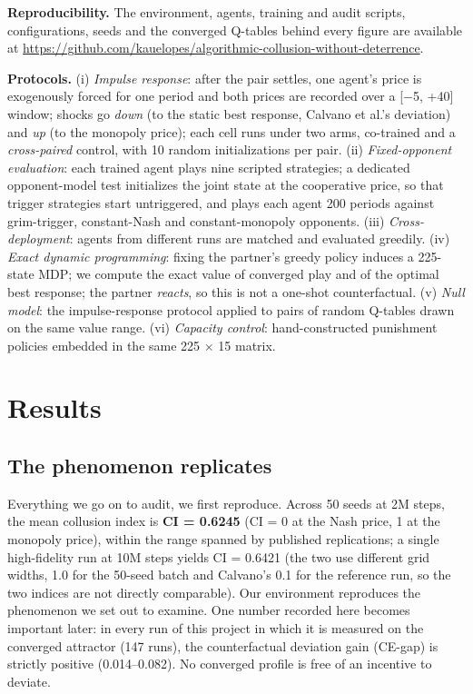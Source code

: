 \documentclass[sigconf]{acmart}
\begin{document}
\textbf{Reproducibility.} The environment, agents, training and audit
scripts, configurations, seeds and the converged Q-tables behind every
figure are available at
\url{https://github.com/kauelopes/algorithmic-collusion-without-deterrence}.

\textbf{Protocols.} (i) \emph{Impulse response}: after the pair settles,
one agent's price is exogenously forced for one period and both prices
are recorded over a {[}\ensuremath{-}5, +40{]} window; shocks go
\emph{down} (to the static best response, Calvano et al.'s deviation)
and \emph{up} (to the monopoly price); each cell runs under two arms,
co-trained and a \emph{cross-paired} control, with 10 random
initializations per pair. (ii) \emph{Fixed-opponent evaluation}: each
trained agent plays nine scripted strategies; a dedicated opponent-model
test initializes the joint state at the cooperative price, so that
trigger strategies start untriggered, and plays each agent 200 periods
against grim-trigger, constant-Nash and constant-monopoly opponents.
(iii) \emph{Cross-deployment}: agents from different runs are matched
and evaluated greedily. (iv) \emph{Exact dynamic programming}: fixing
the partner's greedy policy induces a 225-state MDP; we compute the
exact value of converged play and of the optimal best response; the
partner \emph{reacts}, so this is not a one-shot counterfactual. (v)
\emph{Null model}: the impulse-response protocol applied to pairs of
random Q-tables drawn on the same value range. (vi) \emph{Capacity
control}: hand-constructed punishment policies embedded in the same 225
\ensuremath{\times} 15 matrix.

\section{Results}\label{results}

\subsection{The phenomenon replicates}\label{the-phenomenon-replicates}

Everything we go on to audit, we first reproduce. Across 50 seeds at 2M
steps, the mean collusion index is \textbf{CI = 0.6245} (CI = 0 at the
Nash price, 1 at the monopoly price), within the range spanned by
published replications; a single high-fidelity run at 10M steps yields
CI = 0.6421 (the two use different grid widths, 1.0 for the 50-seed
batch and Calvano's 0.1 for the reference run, so the two indices are
not directly comparable). Our environment reproduces the phenomenon we
set out to examine. One number recorded here becomes important later: in
every run of this project in which it is measured on the converged
attractor (147 runs), the counterfactual deviation gain (CE-gap) is
strictly positive (0.014--0.082). No converged profile is free of an
incentive to deviate.
\end{document}
